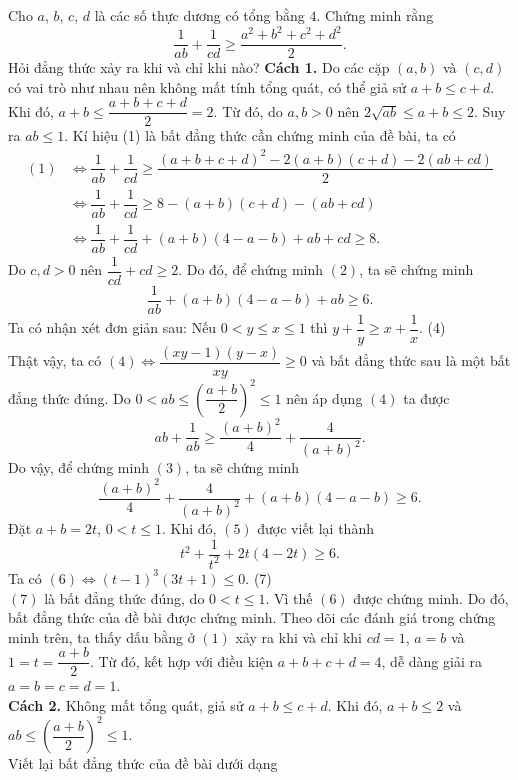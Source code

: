 \begin{bt}%
Cho $a$, $b$, $c$, $d$ là các số thực dương có tổng bằng $4$. Chứng minh rằng \[\dfrac{1}{ab}+\dfrac{1}{cd}\geq\dfrac{a^2+b^2+c^2+d^2}{2}. \tag{1}\]
Hỏi đẳng thức xảy ra khi và chỉ khi nào?
\loigiai
{\textbf{Cách 1.}
	Do các cặp $(a,b)$ và $(c,d)$ có vai trò như nhau nên không mất tính tổng quát, có thể giả sử $a+b\leq c+d$.
	Khi đó, $a+b\leq \dfrac{a+b+c+d}{2}=2$. Từ đó, do $a,b>0$ nên $2\sqrt{ab}\leq a+b \leq 2$. Suy ra $ab \leq 1$. Kí hiệu (1)  là bất đẳng thức cần chứng minh của đề bài, ta có\\
		{\allowdisplaybreaks
		\begin{align*}
		 (1)&\Leftrightarrow \dfrac{1}{ab}+\dfrac{1}{cd} \geq \dfrac{(a+b+c+d)^2-2(a+b)(c+d)-2(ab+cd)}{2}\\
		&\Leftrightarrow  \dfrac{1}{ab}+\dfrac{1}{cd} \geq 8 -(a+b)(c+d)-(ab+cd)\\
	 &\Leftrightarrow \dfrac{1}{ab}+\dfrac{1}{cd} +(a+b)(4-a-b)+ab+cd \geq 8. \tag{2}
		\end{align*}}Do $c,d>0$ nên $\dfrac{1}{cd}+cd \geq 2$. Do đó, để chứng minh $(2)$, ta sẽ chứng minh 
	\[ \dfrac{1}{ab}+(a+b)(4-a-b)+ab\geq 6. \tag{3}\]
	 Ta có nhận xét đơn giản sau:
	 Nếu $0<y\leq x \leq 1$ thì $y+\dfrac{1}{y} \geq x+ \dfrac{1}{x}$. \hfill (4)\\
	 Thật vậy, ta có $(4) \Leftrightarrow \dfrac{(xy-1)(y-x)}{xy}\geq 0$ và bất đẳng thức sau là một bất đẳng thức đúng. Do $0<ab\leq \left( \dfrac{a+b}{2}\right)^2\leq 1 $ nên áp dụng $(4)$ ta được
	 $$ab+\dfrac{1}{ab}\geq \dfrac{(a+b)^2}{4}+\dfrac{4}{(a+b)^2}.$$
	 Do vậy, để chứng minh $(3)$, ta sẽ chứng minh 
	 \[\dfrac{(a+b)^2}{4}+\dfrac{4}{(a+b)^2}+(a+b)(4-a-b)\geq 6. \tag{5} \]
	 Đặt $a+b=2t$, $0<t\leq 1$. Khi đó, $(5)$ được viết lại thành \[t^2+\dfrac{1}{t^2}+2t(4-2t) \geq 6. \tag{6}\]
	 Ta có $(6)\Leftrightarrow (t-1)^3(3t+1)\leq 0$. \hfill (7)\\
	 $(7)$ là bất đẳng thức đúng, do $0<t\leq 1$. Vì thế $(6)$ được chứng minh. Do đó, bất đẳng thức của đề bài được chứng minh.
	 Theo dõi các đánh giá trong chứng minh trên, ta thấy dấu bằng ở $(1)$ xảy ra khi và chỉ khi 
	 $cd=1$, $a=b$ và $1=t=\dfrac{a+b}{2}$. Từ đó, kết hợp với điều kiện $a+b+c+d=4$, dễ dàng giải ra $a=b=c=d=1$.\\
\textbf{Cách 2.}
Không mất tổng quát, giả sử $a+b\leq c+d$. Khi đó, $a+b \leq 2$ và $ab \leq \left( \dfrac{a+b}{2}\right)^2\leq 1 $.\\
Viết lại bất đẳng thức của đề bài dưới dạng
}
\end{bt}
